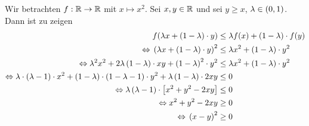 \begin{beispiel}
    Wir betrachten $f: \mathbb{R}\rightarrow{}\mathbb{R}$ mit $x\mapsto x^2$. Sei $x,y\in\mathbb{R}$ und \OBDA sei $y\geq x$, $\lambda\in\left(0,1\right)$. Dann ist zu zeigen
    \begin{align*}
        f\of{\lambda x + \pair{1-\lambda}\cdot y} &\leq \lambda f\of{x} + \pair{1-\lambda}\cdot  f\of{y}\\
        \equivalent \pair{\lambda x+\pair{1-\lambda}\cdot y}^2 &\leq \lambda x^{2} + \pair{1-\lambda}\cdot y^2\\
        \equivalent \lambda^2 x^2 + 2\lambda\pair{1-\lambda}\cdot xy + \pair{1-\lambda}^{2}\cdot y^2 & \leq \lambda x^2 + \pair{1-\lambda}\cdot y^2\\
        \equivalent \lambda\cdot\pair{\lambda -1}\cdot x^2 + \pair{1-\lambda}\cdot\pair{1-\lambda-1}\cdot y^2 + \lambda\pair{1-\lambda}\cdot 2xy &\leq 0\\
        \equivalent \lambda\pair{\lambda -1}\cdot\interv{x^2+y^2-2xy} &\leq 0\\
        \equivalent x^2+y^2-2xy &\geq 0\\
        \equivalent \pair{x-y}^2 &\geq 0
    \end{align*}
\end{beispiel}

\hfill

